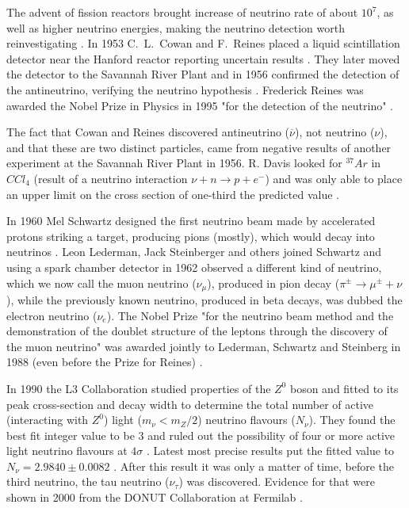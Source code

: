The advent of fission reactors brought increase of neutrino rate of about $10^7$, as well as higher neutrino energies, making the neutrino detection worth reinvestigating \cite{NeutrinoPhysicsCowanReines.pdf}. In 1953 C.~L.~Cowan and F.~Reines placed a liquid scintillation detector near the Hanford reactor reporting uncertain results \cite{CowanReinesFirstAttempt.pdf}. They later moved the detector to the Savannah River Plant and in 1956 confirmed \cite{CowanReinesConfirmation.pdf} the detection of the antineutrino, verifying the neutrino hypothesis \cite{NeutrinoPhysicsCowanReines.pdf}. Frederick Reines was awarded the Nobel Prize in Physics in 1995 "for the detection of the neutrino" \cite{Nobel}.

The fact that Cowan and Reines discovered antineutrino ($\overline{\nu}$), not neutrino ($\nu$), and that these are two distinct particles, came from negative results of another experiment at the Savannah River Plant in 1956. R. Davis looked for $^{37}Ar$ in $CCl_{4}$ (result of a neutrino interaction $\nu +n\rightarrow p+e^{-}$) and was only able to place an upper limit on the cross section of one-third the predicted value \cite{NeutrinoPhysicsCowanReines.pdf}. 

In 1960 Mel Schwartz designed the first neutrino beam made by accelerated protons striking a target, producing pions (mostly), which would decay into neutrinos \cite{GoodmanAdvancesInNeutrinoPhysics.pdf}\cite{SchwartzAccelerators.pdf}. Leon Lederman, Jack Steinberger and others joined Schwartz and using a spark chamber detector in 1962 observed\cite{MuonNeutrinoDetection.pdf} a different kind of neutrino, which we now call the muon neutrino ($\nu_{\mu}$), produced in pion decay ($\pi^{\pm}\rightarrow\mu^{\pm} +\nu$), while the previously known neutrino, produced in beta decays, was dubbed the electron neutrino ($\nu_e$). The Nobel Prize "for the neutrino beam method and the demonstration of the doublet structure of the leptons through the discovery of the muon neutrino" was awarded jointly to Lederman, Schwartz and Steinberg in 1988 (even before the Prize for Reines) \cite{Nobel}.

In 1990 the L3 Collaboration studied properties of the $Z^0$ boson and fitted to its peak cross-section and decay width to determine the total number of active (interacting with $Z^0$) light ($m_{\nu}<m_{Z}/2$) neutrino flavours ($N_{\nu}$). They found the best fit integer value to be 3 and ruled out the possibility of four or more active light neutrino flavours at $4\sigma$ \cite{ZDecay.pdf}. Latest most precise results put the fitted value to $N_{\nu}=2.9840\pm 0.0082$ \cite{ZDecayPrecise.pdf}.
After this result it was only a matter of time, before the third neutrino, the tau neutrino ($\nu_{\tau}$) was discovered. Evidence for that were shown in 2000 from the DONUT Collaboration at Fermilab \cite{ObservationOfTauNeutrino.pdf}.

